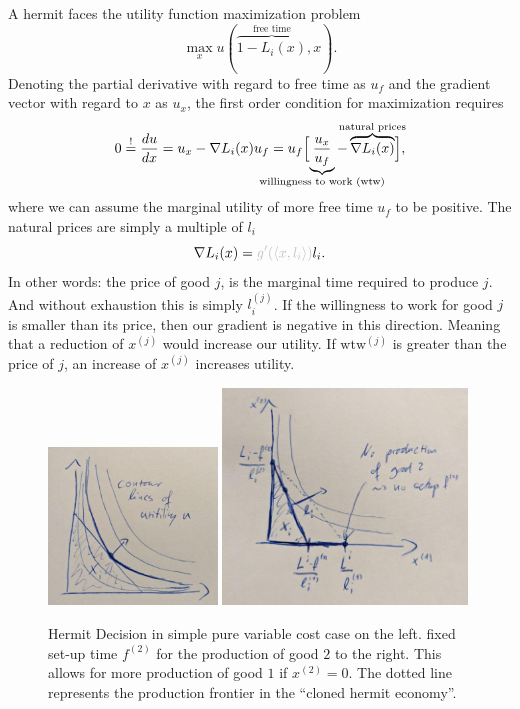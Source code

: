 \begin{example}
	A hermit faces the utility function maximization problem
	\[
		\max_{x} u(\overbrace{1-L_i(x)}^{\text{free time}}, x).
	\]
	Denoting the partial derivative with regard to free time as \(u_f\) and the
	gradient vector with regard to \(x\) as \(u_x\), the first
	order condition for maximization requires
	\[
		0\overset!=\frac{du}{dx}
		= u_x - \nabla L_i(x) u_f
		= u_f \Bigl[
			\underbrace{\frac{u_x}{u_f}}_{\mathclap{\text{willingness to work (wtw)}}}
		- \overbrace{\nabla L_i(x)}^{\mathclap{\text{natural prices}}}
		\Bigr],
	\]
	where we can assume the marginal utility of more free time \(u_f\) to be
	positive. The natural prices are simply {\color{lightgray} a multiple of}
	\(l_i\)
	\[
		\nabla L_i(x) = {\color{lightgray} g'(\langle x, l_i\rangle) }l_i.
	\]
	In other words: the price of good \(j\), is the {\color{lightgray} marginal}
	time required to produce \(j\). And without exhaustion this is simply
	\(l^{(j)}_i\). If the willingness to work for good \(j\) is smaller than
	its price, then our gradient is negative in this direction. Meaning that
	a reduction of \(x^{(j)}\) would increase our utility. If \(\text{wtw}^{(j)}\) is
	greater than the price of \(j\), an increase of \(x^{(j)}\) increases utility.
\end{example}
\begin{figure}
	\includegraphics[width=0.4\textwidth]{images/hermit-decision-pure-variable.jpeg}
	\includegraphics[width=0.58\textwidth]{images/hermit-decision-setup-cost.jpeg}
	\caption{Hermit Decision in simple pure variable cost case on the left.
	fixed set-up time \(f^{(2)}\) for the production of good \(2\) to the right.
	This allows for more production of good \(1\) if \(x^{(2)}=0\). The dotted
	line represents the production frontier in the ``cloned hermit economy''.}
\end{figure}
